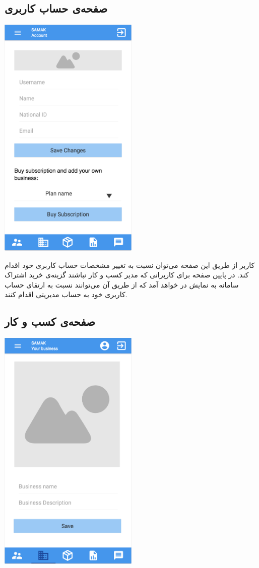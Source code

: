 \subsection{صفحه‌ی حساب کاربری}


\begin{center}
\includegraphics[width = 0.5\textwidth]{images/7-account.png}
\end{center}

کاربر از طریق این صفحه می‌توان نسبت به تغییر مشخصات حساب کاربری خود اقدام کند. در پایین صفحه برای کاربرانی که مدیر کسب و کار نباشند گزینه‌ی خرید اشتراک سامانه به نمایش در خواهد آمد که از طریق آن می‌توانند نسبت به ارتقای حساب کاربری خود به حساب مدیریتی اقدام کنند.


\subsection{صفحه‌ی کسب و کار}


\begin{center}
\includegraphics[width = 0.5\textwidth]{images/8-business.png}
\end{center}


